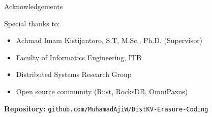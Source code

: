 \documentclass[a2,portrait]{config/poster/a0poster}
\newcommand{\postersection}[1]{%
	\begin{tcolorbox}[
			colback=ITBblue,
			colframe=ITBblue,
			fonttitle=\bfseries,
			coltext=white,
			sharp corners,
			boxrule=0pt,
			top=0pt,
			bottom=0pt,
			halign=center
		]
		\normalsize #1
	\end{tcolorbox}%
}
\begin{document}
\begin{multicols}{4}

	\postersection{Acknowledgements}
	
	Special thanks to:
	\begin{itemize}
		\item Achmad Imam Kistijantoro, S.T, M.Sc., Ph.D. (Supervisor)
		\item Faculty of Informatics Engineering, ITB
		\item Distributed Systems Research Group
		\item Open source community (Rust, RocksDB, OmniPaxos)
	\end{itemize}

	\vspace{0.5cm}
	\textbf{Repository:} \texttt{github.com/MuhamadAjiW/DistKV-Erasure-Coding}

\end{multicols}
\end{document}

